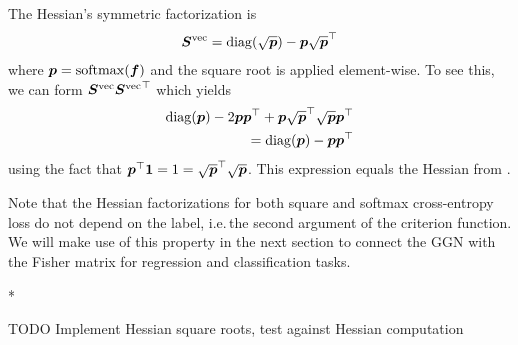 \begin{example}\label{ex:crossentropyloss_hessian_factorization}
  The Hessian's symmetric factorization is \citep[e.g.][]{papyan2019measurements}
  \begin{align*}
    {\bm{S}}^{\operatorname{vec}} = \operatorname{diag}(\sqrt{{\bm{p}}}) - {\bm{p}} \sqrt{{\bm{p}}}^{\top}
  \end{align*}
  where ${\bm{p}} = \mathrm{softmax}({\bm{f}})$ and the square root is applied element-wise.
  To see this, we can form ${\bm{S}}^{\operatorname{vec}} {{\bm{S}}^{\operatorname{vec}}}^{\top}$ which yields
  \begin{align*}
    \operatorname{diag}({\bm{p}}) - 2 {\bm{p}} {\bm{p}}^{\top} + {\bm{p}} \sqrt{{\bm{p}}}^{\top} \sqrt{{\bm{p}}} {\bm{p}}^{\top}
    \\
    = \operatorname{diag}({\bm{p}}) - {\bm{p}} {\bm{p}}^{\top}
  \end{align*}
  using the fact that ${\bm{p}}^{\top} {\bm{1}} = 1 = \sqrt{{\bm{p}}}^{\top} \sqrt{{\bm{p}}}$.
  This expression equals the Hessian from .
\end{example}
Note that the Hessian factorizations for both square and softmax cross-entropy loss do not depend on the label, i.e.\,the second argument of the criterion function.
We will make use of this property in the next section to connect the GGN with the Fisher matrix for regression and classification tasks.

\switchcolumn[1]*
\switchcolumn[0]

TODO Implement Hessian square roots, test against Hessian computation


